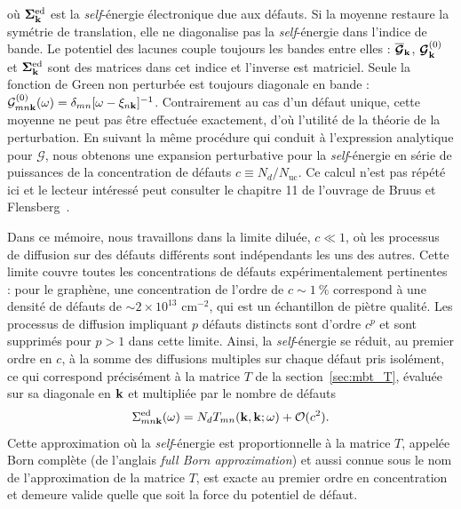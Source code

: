 où $\bm{\Sigma}_{\mathbf{k}}^\text{ed}$ est la \textit{self}-énergie électronique due aux défauts. Si la moyenne restaure la symétrie de translation, elle ne diagonalise pas la \textit{self}-énergie dans l'indice de bande. Le potentiel des lacunes couple toujours les bandes entre elles : $\overline{\bm{\mathcal{G}}}_{\mathbf{k}}$, $\bm{\mathcal{G}}^{(0)}_{\mathbf{k}}$ et $\bm{\Sigma}^\text{ed}_{\mathbf{k}}$ sont des matrices dans cet indice et l'inverse est matriciel. Seule la fonction de Green non perturbée est toujours diagonale en bande : $\mathcal{G}^{(0)}_{mn\mathbf{k}}(\omega)=\delta_{mn}[\omega-\xi_{n\mathbf{k}}]^{-1}$. Contrairement au cas d'un défaut unique, cette moyenne ne peut pas être effectuée exactement, d'où l'utilité de la théorie de la perturbation. En suivant la même procédure qui conduit à l'expression analytique pour $\mathcal{G}$, nous obtenons une expansion perturbative pour la \textit{self}-énergie en série de puissances de la concentration de défauts $c\equiv N_d/N_\text{uc}$. Ce calcul n'est pas répété ici et le lecteur intéressé peut consulter le chapitre 11 de l'ouvrage de Bruus et Flensberg~\cite{bruusManyBodyQuantumTheory2004}.

Dans ce mémoire, nous travaillons dans la limite diluée, $c\ll 1$, où les processus de diffusion sur des défauts différents sont indépendants les uns des autres. Cette limite couvre toutes les concentrations de défauts expérimentalement pertinentes : pour le graphène, une concentration de l'ordre de $c\sim 1~\%$ correspond à une densité de défauts de $\sim 2\times 10^{13}$ cm$^{-2}$, qui est un échantillon de piètre qualité. Les processus de diffusion impliquant $p$ défauts distincts sont d'ordre $c^p$ et sont supprimés pour $p>1$ dans cette limite. Ainsi, la \textit{self}-énergie se réduit, au premier ordre en $c$, à la somme des diffusions multiples sur chaque défaut pris isolément, ce qui correspond précisément à la matrice $T$ de la section~\ref{sec:mbt_T}, évaluée sur sa diagonale en $\mathbf{k}$ et multipliée par le nombre de défauts~\cite{bruusManyBodyQuantumTheory2004}
\begin{equation}
    \Sigma_{mn\mathbf{k} }^\text{ed}(\omega) = N_d T_{mn}(\mathbf{k},\mathbf{k};\omega)+\mathcal{O}(c^2).\label{eqn:sigma_diluée}
\end{equation}
Cette approximation où la \textit{self}-énergie est proportionnelle à la matrice $T$, appelée Born complète (de l'anglais \textit{full Born approximation}) et aussi connue sous le nom de l'approximation de la matrice $T$, est exacte au premier ordre en concentration et demeure valide quelle que soit la force du potentiel de défaut.

